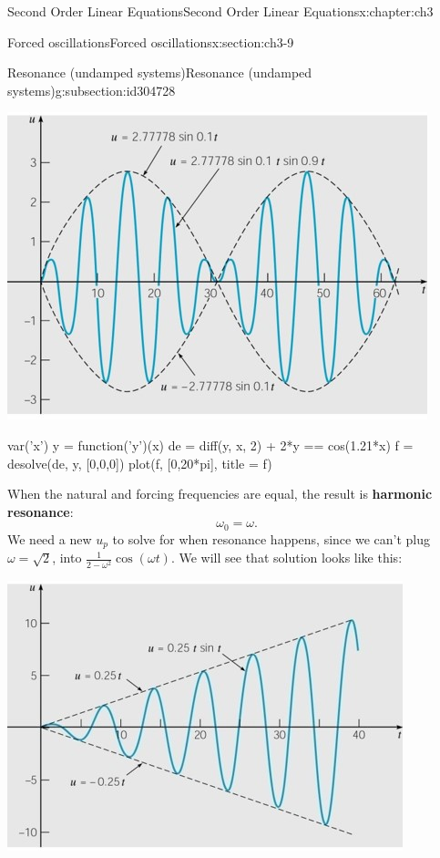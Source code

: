 \documentclass[oneside,10pt,]{book}
\newcommand{\terminology}[1]{\textbf{#1}}
\numberwithin{equation}{section}
\numberwithin{equation}{section}
\begin{document}
\begin{chapterptx}{Second Order Linear Equations}{}{Second Order Linear Equations}{}{}{x:chapter:ch3}
\begin{sectionptx}{Forced oscillations}{}{Forced oscillations}{}{}{x:section:ch3-9}
\begin{subsectionptx}{Resonance (undamped systems)}{}{Resonance (undamped systems)}{}{}{g:subsection:id304728}
\begin{image}{0}{1}{0}
\includegraphics[width=\linewidth]{images/3.8-2.jpg}
\end{image}%
%
\begin{sageinput}
var('x')
y = function('y')(x)
de = diff(y, x, 2) + 2*y == cos(1.21*x)
f = desolve(de, y, [0,0,0])
plot(f, [0,20*pi], title = f)
\end{sageinput}
When the natural and forcing frequencies are equal, the result is \terminology{harmonic resonance}:%
\begin{equation*}
\omega_{0}=\omega.
\end{equation*}
We need a new \(u_{p}\) to solve for when resonance happens, since we can't plug \(\omega=\sqrt{2}\), into \(\frac{1}{2-\omega^{2}}\cos\left(\omega t\right)\). We will see that solution looks like this: \begin{image}{0}{1}{0}%
\includegraphics[width=\linewidth]{images/3.8-3.jpg}

\end{image}
\end{subsectionptx}
\end{sectionptx}
\end{chapterptx}
\end{document}
